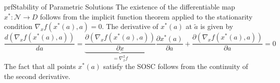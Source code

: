 \begin{prf}{prfStability of Parametric Solutions}
    The existence of the differentiable map $x^*: \mathcal{N} \rightarrow D$ follows from the implicit function theorem applied to the stationarity condition $\nabla_x f(x^*(a), a) = 0$. The derivative of $x^*(a)$ at $\tilde{a}$ is given by
    \begin{equation*}
        \frac{d(\nabla_x f(x^*(a),a))}{da} = \underbrace{\frac{\partial \left(\nabla_x f(x^*(a), a)\right)}{\partial x}}_{= \nabla^2_x f} \frac{\partial x^*(a)}{\partial a} + \frac{\partial \left(\nabla_x f(x^*(a), a)\right)}{\partial a} = 0
    \end{equation*}
    The fact that all points $x^*(a)$ satisfy the SOSC follows from the continuity of the second derivative.
\end{prf}